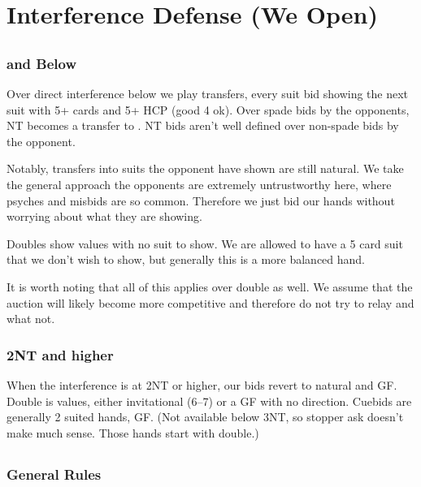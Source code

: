\documentclass[main]{subfile}
\begin{document}
	
\chapter{Interference Defense (We Open)}
	
	\section[1C]{}
	
		\subsection[2S and Below]{ and Below}
		
		Over direct interference below  we play transfers, every suit bid showing the next suit with 5+ cards and 5+ HCP (good 4 ok). Over spade bids by the opponents, NT becomes a transfer to \ccc. NT bids aren't well defined over non-spade bids by the opponent. 
		
		Notably, transfers into suits the opponent have shown are still natural. We take the general approach the opponents are extremely untrustworthy here, where psyches and misbids are so common. Therefore we just bid our hands without worrying about what they are showing.
		
		Doubles show values with no suit to show. We are allowed to have a 5 card suit that we don't wish to show, but generally this is a more balanced hand.
	
		It is worth noting that all of this applies over double as well. We assume that the auction will likely become more competitive and therefore do not try to relay and what not. 
		
		\subsection{2NT and higher}
		
		When the interference is at 2NT or higher, our bids revert to natural and GF. Double is values, either invitational (6--7) or a GF with no direction. Cuebids are generally 2 suited hands, GF. (Not available below 3NT, so stopper ask doesn't make much sense. Those hands start with double.)
	
	\section[1D]{}
	
		\subsection{General Rules}
		
\end{document}
